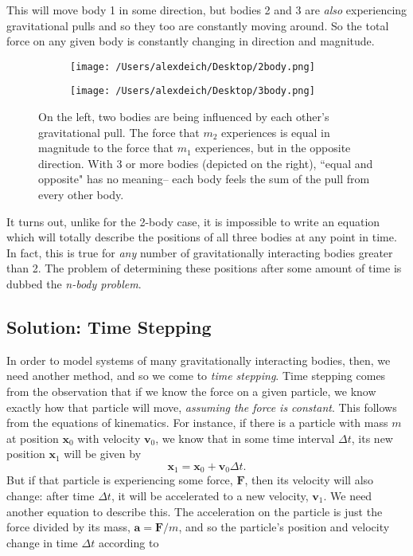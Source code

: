 \documentclass[11pt]{article}
\begin{document}
This will move body 1 in some direction, but bodies 2 and 3 are \emph{also} experiencing gravitational pulls and so they too are constantly moving around. So the total force on any given body is constantly changing in direction and magnitude.

\begin{figure}[ht]
\centering
\begin{subfigure}[t]{.5\textwidth}
  \centering
\texttt{[image: /Users/alexdeich/Desktop/2body.png]}
  \label{fig:2body}
\end{subfigure}%
\hfill
\begin{subfigure}[t]{.5\textwidth}
  \centering
  \texttt{[image: /Users/alexdeich/Desktop/3body.png]}
  \label{fig:3body}
\end{subfigure}
\caption{On the left, two bodies are being influenced by each other's gravitational pull.  The force that $m_2$ experiences is equal in magnitude to the force that $m_1$ experiences, but in the opposite direction.  With 3 or more bodies (depicted on the right), ``equal and opposite" has no meaning\--- each body feels the sum of the pull from every other body.}
\end{figure}

It turns out, unlike for the 2-body case, it is impossible to write an equation which will totally describe the positions of all three bodies at any point in time.  In fact, this is true for \emph{any} number of gravitationally interacting bodies greater than 2.  The problem of determining these positions after some amount of time is dubbed the \emph{n-body problem}.

\subsection{Solution: Time Stepping}
In order to model systems of many gravitationally interacting bodies, then, we need another method, and so we come to \emph{time stepping}.  Time stepping comes from the observation that if we know the force on a given particle, we know exactly how that particle will move, \emph{assuming the force is constant}.  This follows from the equations of kinematics.  For instance, if there is a particle with mass $m$ at position $\mathbf{x}_0$ with velocity $\mathbf{v}_0$, we know that in some time interval $\Delta t$, its new position $\mathbf{x}_1$ will be given by
\begin{equation*}
\mathbf{x}_1=\mathbf{x}_0 + \mathbf{v}_0 \Delta t.
\end{equation*}
But if that particle is experiencing some force, $\mathbf{F}$, then its velocity will also change: after time $\Delta t$, it will be accelerated to a new velocity, $\mathbf{v}_1$.  We need another equation to describe this.  The acceleration on the particle is just the force divided by its mass, $\mathbf{a} = \mathbf{F}/m$, and so the particle's position and velocity change in time $\Delta t$ according to
\end{document}
